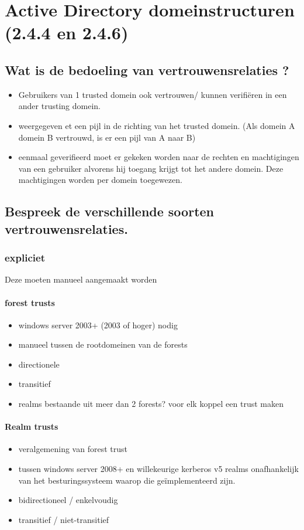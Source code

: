 \chapter{Active Directory domeinstructuren (2.4.4 en 2.4.6)}
\section{Wat is de bedoeling van vertrouwensrelaties ?}
\begin{itemize}
\item Gebruikers van 1 trusted domein ook vertrouwen/ kunnen verifi\"eren in een ander trusting domein.
\item weergegeven et een pijl in de richting van het trusted domein. (Als domein A domein B vertrouwd, is er een pijl van A naar B)
\item eenmaal geverifieerd moet er gekeken worden naar de rechten en machtigingen van een gebruiker alvorens hij toegang krijgt tot het andere domein. Deze machtigingen worden per domein toegewezen.
\end{itemize}

\section{Bespreek de verschillende soorten vertrouwensrelaties.}
\subsection{expliciet}
Deze moeten manueel aangemaakt worden
\subsubsection{forest trusts}
\begin{itemize}
\item windows server 2003+ (2003 of hoger) nodig
\item manueel tussen de rootdomeinen van de forests
\item directionele
\item transitief
\item realms bestaande uit meer dan 2 forests? voor elk koppel een trust maken
\end{itemize}

\subsubsection{Realm trusts}
\begin{itemize}
\item veralgemening van forest trust
\item tussen windows server 2008+ en willekeurige kerberos v5 realms onafhankelijk van het besturingssysteem waarop die ge\"implementeerd zijn.
\item bidirectioneel / enkelvoudig 
\item transitief / niet-transitief
\end{itemize}
 
